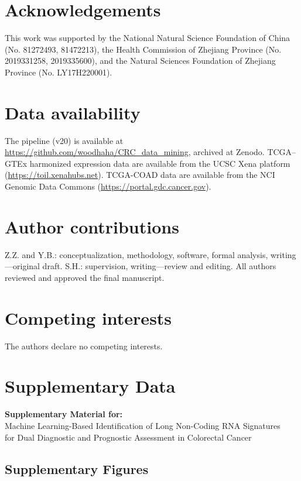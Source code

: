 \documentclass[11pt,a4paper]{article}
\begin{document}
\section*{Acknowledgements}
This work was supported by the National Natural Science Foundation of China (No. 81272493, 81472213), the Health Commission of Zhejiang Province (No. 2019331258, 2019335600), and the Natural Sciences Foundation of Zhejiang Province (No. LY17H220001).

\section*{Data availability}
The pipeline (v20) is available at \url{https://github.com/woodhaha/CRC_data_mining}, archived at Zenodo. TCGA--GTEx harmonized expression data are available from the UCSC Xena platform (\url{https://toil.xenahubs.net}). TCGA-COAD data are available from the NCI Genomic Data Commons (\url{https://portal.gdc.cancer.gov}).

\section*{Author contributions}
Z.Z. and Y.B.: conceptualization, methodology, software, formal analysis, writing---original draft. S.H.: supervision, writing---review and editing. All authors reviewed and approved the final manuscript.

\section*{Competing interests}
The authors declare no competing interests.




\clearpage
\section*{Supplementary Data}

\begin{center}
\textbf{Supplementary Material for:}\\
Machine Learning-Based Identification of Long Non-Coding RNA Signatures\\
for Dual Diagnostic and Prognostic Assessment in Colorectal Cancer
\end{center}

\subsection*{Supplementary Figures}
\end{document}
